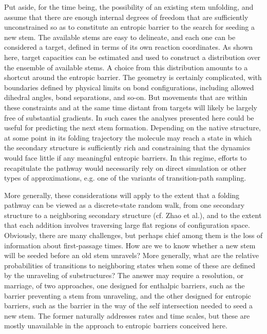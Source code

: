 \documentclass[nofootinbib,english, aip, jcp, priprint, graphicx,floatfix]{revtex4-1}
\theoremstyle{plain}
\theoremstyle{definition}
\theoremstyle{plain}
\begin{document}
Put aside, for the time being, the possibility of an existing stem unfolding, and assume that there are enough internal degrees of freedom that are sufficiently unconstrained so as to constitute an entropic barrier to the search for seeding a new stem. The available stems are easy to delineate, and each one can be considered a target, defined in terms of its own reaction coordinates. As shown here, target capacities can be estimated and used to construct a distribution over the ensemble of available stems. A choice from this distribution amounts to a shortcut around the entropic barrier. The geometry is certainly complicated, with boundaries defined by physical limits on bond configurations, including allowed dihedral angles, bond separations, and so-on. But movements that are within these constraints and at the same time distant from targets will likely be largely free of substantial gradients. In such cases the analyses presented here could be useful for predicting the next stem formation. 
Depending on the native structure, at some point in its folding trajectory the molecule may reach a state in which the secondary structure is sufficiently rich and constraining that the dynamics would face
little if any meaningful entropic barriers. In this regime, efforts to recapitulate the pathway would necessarily rely on direct simulation or other types of approximations, e.g. one of the variants of transition-path sampling.

More generally, these considerations will apply to the extent that a folding pathway can be viewed as 
a discrete-state random walk, from one secondary structure to a neighboring secondary structure (cf. Zhao et al.\cite{Zhao2010-zipping}),
and to the extent that each addition involves traversing large flat regions of configuration space. Obviously, there are many challenges, but perhaps chief among them is the loss of information about first-passage times. How are we to know whether a new stem will be seeded before an old stem unravels? More generally, what are the relative probabilities of transitions to neighboring states when some of these are defined by the unraveling of substructures? The answer may require a resolution, or marriage, of two approaches, one designed for enthalpic barriers, such as the barrier preventing a stem from unraveling, and the other designed for entropic barriers, such as the barrier in the way of the self intersection needed to seed a new stem. The former naturally addresses rates and time scales, but these are mostly unavailable in the approach to entropic barriers conceived here.
\end{document}
